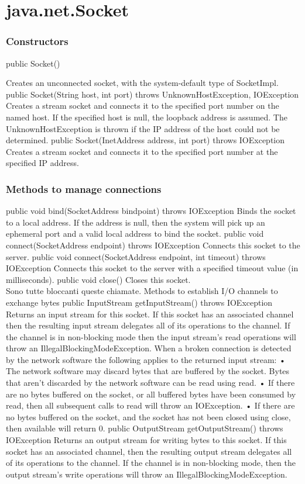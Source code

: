 \section{java.net.Socket}
\subsubsection{Constructors}
\begin{description}
    \item[public Socket()] 
\end{description}
Creates an unconnected socket, with the system-default type of SocketImpl.
public Socket(String host, int port)
throws UnknownHostException, IOException
Creates a stream socket and connects it to the specified port number on the named host. If the specified host is null, the
loopback address is assumed.
The UnknownHostException is thrown if the IP address of the host could not be determined.
public Socket(InetAddress address, int port)
throws IOException
Creates a stream socket and connects it to the specified port number at the specified IP address.
\subsubsection{Methods to manage connections}
public void bind(SocketAddress bindpoint) throws IOException
Binds the socket to a local address. If the address is null, then the system will pick up an ephemeral port and a valid local address
to bind the socket.
public void connect(SocketAddress endpoint) throws IOException
Connects this socket to the server.
public void connect(SocketAddress endpoint, int timeout)
throws IOException
Connects this socket to the server with a specified timeout value (in milliseconds).
public void close()
Closes this socket.
\\Sono tutte bloccanti queste chiamate.
Methods to establish I/O channels to exchange bytes
public InputStream getInputStream() throws IOException
Returns an input stream for this socket.
If this socket has an associated channel then the resulting input stream delegates all of its operations to the channel.
If the channel is in non-blocking mode then the input stream's read operations will throw an
IllegalBlockingModeException.
When a broken connection is detected by the network software the following applies to the returned input stream:
• The network software may discard bytes that are buffered by the socket. Bytes that aren't discarded by the
network software can be read using read.
• If there are no bytes buffered on the socket, or all buffered bytes have been consumed by read, then all
subsequent calls to read will throw an IOException.
• If there are no bytes buffered on the socket, and the socket has not been closed using close, then available
will return 0.
public OutputStream getOutputStream() throws IOException
Returns an output stream for writing bytes to this socket.
If this socket has an associated channel, then the resulting output stream delegates all of its operations to the
channel.
If the channel is in non-blocking mode, then the output stream's write operations will throw an
IllegalBlockingModeException.

